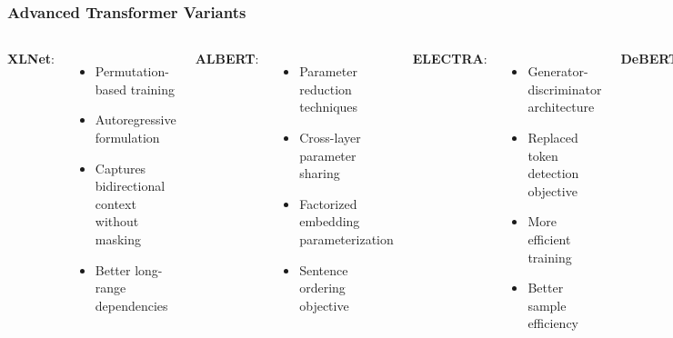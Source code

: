 \documentclass{beamer}
\begin{document}
\begin{frame}
\frametitle{Advanced Transformer Variants}
\begin{columns}
\textbf{XLNet}:
\begin{itemize}
    \item Permutation-based training
    \item Autoregressive formulation
    \item Captures bidirectional context without masking
    \item Better long-range dependencies
\end{itemize}

\textbf{ALBERT}:
\begin{itemize}
    \item Parameter reduction techniques
    \item Cross-layer parameter sharing
    \item Factorized embedding parameterization
    \item Sentence ordering objective
\end{itemize}

\textbf{ELECTRA}:
\begin{itemize}
    \item Generator-discriminator architecture
    \item Replaced token detection objective
    \item More efficient training
    \item Better sample efficiency
\end{itemize}

\textbf{DeBERTa}:
\begin{itemize}
    \item Disentangled attention mechanism
    \item Enhanced mask decoder
    \item Separate content and position attention
    \item State-of-the-art performance
\end{itemize}
\end{columns}
\end{frame}
\end{document}
